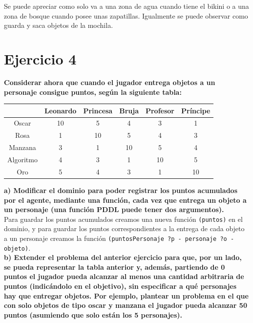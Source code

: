 \documentclass[12pt]{article}
\begin{document}
Se puede apreciar como solo va a una zona de agua cuando tiene el bikini o a una zona de bosque cuando posee unas zapatillas. Igualmente se puede observar como guarda y saca objetos de la mochila.

\section{Ejercicio 4} \textbf{Considerar ahora que cuando el jugador entrega objetos a un personaje consigue puntos, según la siguiente tabla:}

\begin{table}[H]
\centering
\begin{tabular}{c|c|c|c|c|c|}
\cline{2-6}
                                & Leonardo & Princesa & Bruja & Profesor & Príncipe \\ \hline
\multicolumn{1}{|c|}{Oscar}     & 10       & 5        & 4     & 3        & 1        \\ \hline
\multicolumn{1}{|c|}{Rosa}      & 1        & 10       & 5     & 4        & 3        \\ \hline
\multicolumn{1}{|c|}{Manzana}   & 3        & 1        & 10    & 5        & 4        \\ \hline
\multicolumn{1}{|c|}{Algoritmo} & 4        & 3        & 1     & 10       & 5        \\ \hline
\multicolumn{1}{|c|}{Oro}       & 5        & 4        & 3     & 1        & 10       \\ \hline
\end{tabular}
\end{table}

\textbf{a) Modificar el dominio para poder registrar los puntos acumulados por el agente, mediante una función, cada vez que entrega un objeto a un personaje (una función PDDL puede tener dos argumentos).}\\

Para guardar los puntos acumulados creamos una nueva función \texttt{(puntos)} en el dominio, y para guardar los puntos correspondientes a la entrega de cada objeto a un personaje creamos la función \texttt{(puntosPersonaje ?p - personaje ?o - objeto)}.\\

\textbf{b) Extender el problema del anterior ejercicio para que, por un lado, se pueda representar la tabla anterior y, además, partiendo de 0 puntos el jugador pueda alcanzar al menos una cantidad arbitraria de puntos (indicándolo en el objetivo), sin especificar a qué personajes hay que entregar objetos. Por ejemplo, plantear un problema en el que con solo objetos de tipo oscar y manzana el jugador pueda alcanzar 50 puntos (asumiendo que solo están los 5 personajes).}\\
\end{document}
